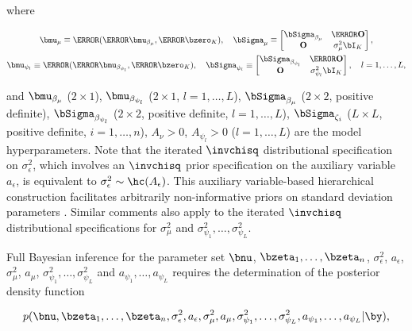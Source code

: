 \documentclass[12pt]{article}
\def\sigsqeps{\sigma^2_{\epsilon}}
\def\aeps{a_{\epsilon}}
\def\sigsqmu{\sigma^2_{\mu}}
\def\amu{a_{\mu}}
\newcommand\sigsqpsi[1]{\sigma^2_{\psi_{#1}}}
\newcommand\apsi[1]{a_{\psi_{#1}}}
\theoremstyle{plain}
\theoremstyle{definition}
\theoremstyle{remark}
\begin{document}
\noindent where

\begin{equation}
\begin{gathered}
	\bmu_\mu \equiv \T{(\T{\bmu_{\beta_\mu}}, \T{\bzero_K})}, \quad
	\bSigma_\mu \equiv \begin{bmatrix}
		\bSigma_{\beta_\mu} & \T{\textbf{O}} \\
		\textbf{O} & \sigsqmu \bI_{K}
	\end{bmatrix}, \\
	$$
	\bmu_{\psi_l} \equiv \T{(\T{\bmu_{\beta_{\psi_l}}}, \T{\bzero_K})}, \quad
	\bSigma_{\psi_l} \equiv \begin{bmatrix}
		\bSigma_{\beta_{\psi_l}} & \T{\textbf{O}} \\
		\textbf{O} & \sigsqpsi{l} \bI_{K}
	\end{bmatrix}, \quad l = 1, \dots, L,
\end{gathered}
\label{sub_vecs_mats}
\end{equation}

\noindent and $\bmu_{\beta_\mu}$ ($2 \times 1$), $\bmu_{\beta_{\psi_l}}$ ($2 \times 1$, $l = 1, \dots, L$),
$\bSigma_{\beta_\mu}$ ($2 \times 2$, positive definite), $\bSigma_{\beta_{\psi_l}}$ ($2 \times 2$, positive definite,
$l = 1, \dots, L$), $\bSigma_{\zeta_i}$ ($L \times L$, positive definite, $i = 1, \dots, n$), $A_\nu > 0$,
$A_{\psi_l} > 0$ ($l = 1, \dots, L$) are the model hyperparameters.
Note that the iterated $\invchisq$ distributional specification on $\sigsqeps$,
which involves an $\invchisq$ prior specification on the auxiliary variable $\aeps$, is equivalent to $\sigsqeps \sim
\hc (A_{\epsilon})$. This auxiliary variable-based hierarchical construction facilitates arbitrarily non-informative
priors on standard deviation parameters \cite{gelman06}. Similar comments also apply to the iterated $\invchisq$
distributional specifications for $\sigsqmu$ and $\sigsqpsi{1}, \dots, \sigsqpsi{L}$.

Full Bayesian inference for the parameter set $\bnu$, $\bzeta_1, \dots, \bzeta_n$, $\sigsqeps$, $\aeps$,
$\sigsqmu$, $\amu$, $\sigsqpsi{1}, \dots, \sigsqpsi{L}$ and $\apsi{1}, \dots, \apsi{L}$ requires the determination
of the posterior density function

\[
	p (
		\bnu, \bzeta_1, \dots, \bzeta_n, \sigsqeps, \aeps, \sigsqmu, \amu,
		\sigsqpsi{1}, \dots, \sigsqpsi{L}, \apsi{1}, \dots, \apsi{L} | \by
	),
\]
\end{document}
